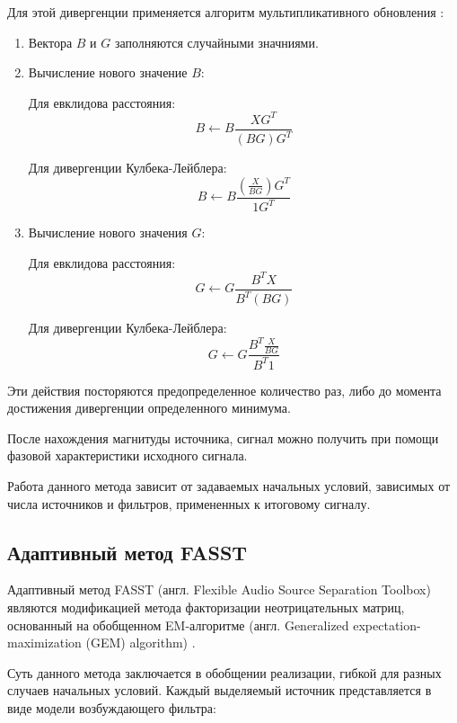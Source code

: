 Для этой дивергенции применяется алгоритм мультипликативного обновления \cite{DLee}:

\begin{enumerate}
	\item Вектора $B$ и $G$ заполняются случайными значниями.
	\item Вычисление нового значение $B$: 
	
	Для евклидова расстояния:
	\begin{equation}
	B \leftarrow B \frac{XG^T}{(BG)G^T}
	\end{equation}
	
	Для дивергенции Кулбека-Лейблера:
	\begin{equation}
	B \leftarrow B \frac{ (\frac{X}{BG}) G^T}{1G^T}
	\end{equation}
	\item Вычисление нового значения $G$:
	
	Для евклидова расстояния:
	\begin{equation}
	G \leftarrow G \frac{B^T X}{B^T (BG)}
	\end{equation}
	
	Для дивергенции Кулбека-Лейблера:
	\begin{equation}
	G \leftarrow G \frac{B^T \frac{X}{BG}}{B^T1}
	\end{equation}
\end{enumerate}

Эти действия посторяются предопределенное количество раз, либо до момента достижения дивергенции определенного минимума.

После нахождения магнитуды источника, сигнал можно получить при помощи фазовой характеристики исходного сигнала. 

Работа данного метода зависит от задаваемых начальных условий, зависимых от числа источников и фильтров, примененных к итоговому сигналу.

\subsection{Адаптивный метод FASST}

Адаптивный метод FASST (англ. Flexible Audio Source Separation Toolbox) являются модификацией метода факторизации неотрицательных матриц, основанный на обобщенном EM-алгоритме (англ. Generalized expectation-maximization (GEM) algorithm) \cite{ozerov}. 

Суть данного метода заключается в обобщении реализации, гибкой для разных случаев начальных условий. Каждый выделяемый источник представляется в виде модели возбуждающего фильтра:


